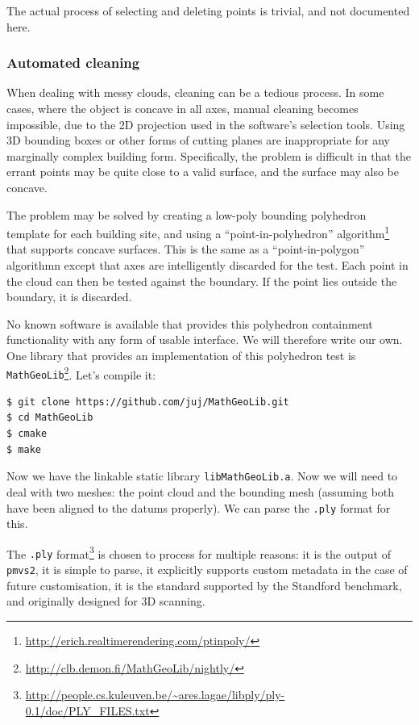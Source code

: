 \documentclass{article}
\begin{document}
The actual process of selecting and deleting points is trivial, and not documented here.

\subsubsection{Automated cleaning}

When dealing with messy clouds, cleaning can be a tedious process. In some cases, where the object is concave in all axes, manual cleaning becomes impossible, due to the 2D projection used in the software's selection tools. Using 3D bounding boxes or other forms of cutting planes are inappropriate for any marginally complex building form. Specifically, the problem is difficult in that the errant points may be quite close to a valid surface, and the surface may also be concave.

The problem may be solved by creating a low-poly bounding polyhedron template for each building site, and using a ``point-in-polyhedron'' algorithm\footnote{\url{http://erich.realtimerendering.com/ptinpoly/}} that supports concave surfaces. This is the same as a ``point-in-polygon'' algorithmn except that axes are intelligently discarded for the test. Each point in the cloud can then be tested against the boundary. If the point lies outside the boundary, it is discarded.

No known software is available that provides this polyhedron containment functionality with any form of usable interface. We will therefore write our own. One library that provides an implementation of this polyhedron test is {\tt MathGeoLib}\footnote{\url{http://clb.demon.fi/MathGeoLib/nightly/}}. Let's compile it:

\begin{lstlisting}
$ git clone https://github.com/juj/MathGeoLib.git
$ cd MathGeoLib
$ cmake
$ make
\end{lstlisting}

Now we have the linkable static library {\tt libMathGeoLib.a}. Now we will need to deal with two meshes: the point cloud and the bounding mesh (assuming both have been aligned to the datums properly). We can parse the {\tt .ply} format for this.

The {\tt .ply} format\footnote{\url{http://people.cs.kuleuven.be/~ares.lagae/libply/ply-0.1/doc/PLY_FILES.txt}} is chosen to process for multiple reasons: it is the output of {\tt pmvs2}, it is simple to parse, it explicitly supports custom metadata in the case of future customisation, it is the standard supported by the Standford benchmark, and originally designed for 3D scanning.
\end{document}

